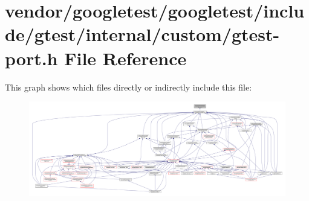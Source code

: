 \hypertarget{custom_2gtest-port_8h}{}\section{vendor/googletest/googletest/include/gtest/internal/custom/gtest-\/port.h File Reference}
\label{custom_2gtest-port_8h}
This graph shows which files directly or indirectly include this file\+:\nopagebreak
\begin{figure}[H]
\begin{center}
\leavevmode
\includegraphics[width=350pt]{custom_2gtest-port_8h__dep__incl}
\end{center}
\end{figure}
